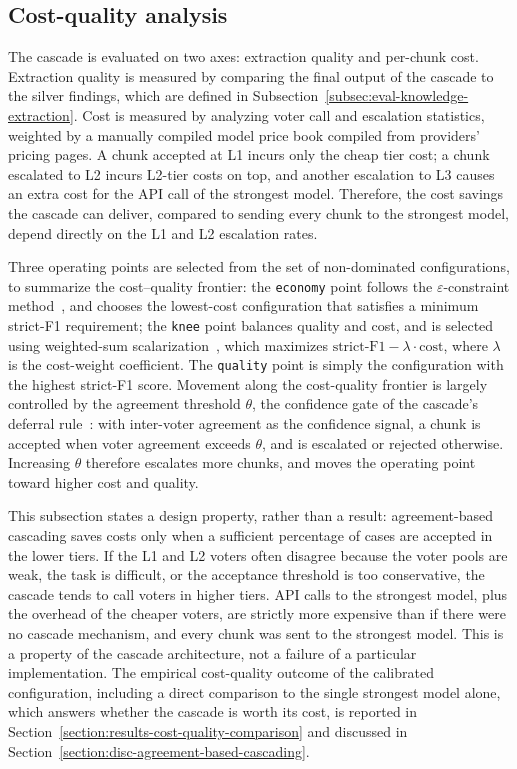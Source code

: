 \subsection{Cost-quality analysis}\label{subsec:abc-cost-quality}

The cascade is evaluated on two axes: extraction quality and per-chunk cost. Extraction quality is measured by comparing the final output of the cascade to the silver findings, which are defined in Subsection~\ref{subsec:eval-knowledge-extraction}. Cost is measured by analyzing voter call and escalation statistics, weighted by a manually compiled model price book compiled from providers' pricing pages. A chunk accepted at L1 incurs only the cheap tier cost; a chunk escalated to L2 incurs L2-tier costs on top, and another escalation to L3 causes an extra cost for the API call of the strongest model. Therefore, the cost savings the cascade can deliver, compared to sending every chunk to the strongest model, depend directly on the L1 and L2 escalation rates.

Three operating points are selected from the set of non-dominated configurations, to summarize the cost--quality frontier: the \texttt{economy} point follows the $\varepsilon$-constraint method~\parencite{haimes1971onabicriterionformulation}, and chooses the lowest-cost configuration that satisfies a minimum strict-F1 requirement; the \texttt{knee} point balances quality and cost, and is selected using weighted-sum scalarization~\parencite{boyd2004convexoptimization}, which maximizes $\text{strict-F1} - \lambda\cdot\text{cost}$, where $\lambda$ is the cost-weight coefficient. The \texttt{quality} point is simply the configuration with the highest strict-F1 score. Movement along the cost-quality frontier is largely controlled by the agreement threshold $\theta$, the confidence gate of the cascade's deferral rule~\parencite{jitkrittum2023confidencebasedcascadedeferral}: with inter-voter agreement as the confidence signal, a chunk is accepted when voter agreement exceeds $\theta$, and is escalated or rejected otherwise. Increasing $\theta$ therefore escalates more chunks, and moves the operating point toward higher cost and quality.

This subsection states a design property, rather than a result: agreement-based cascading saves costs only when a sufficient percentage of cases are accepted in the lower tiers. If the L1 and L2 voters often disagree because the voter pools are weak, the task is difficult, or the acceptance threshold is too conservative, the cascade tends to call voters in higher tiers. API calls to the strongest model, plus the overhead of the cheaper voters, are strictly more expensive than if there were no cascade mechanism, and every chunk was sent to the strongest model. This is a property of the cascade architecture, not a failure of a particular implementation. The empirical cost-quality outcome of the calibrated configuration, including a direct comparison to the single strongest model alone, which answers whether the cascade is worth its cost, is reported in Section~\ref{section:results-cost-quality-comparison} and discussed in Section~\ref{section:disc-agreement-based-cascading}.